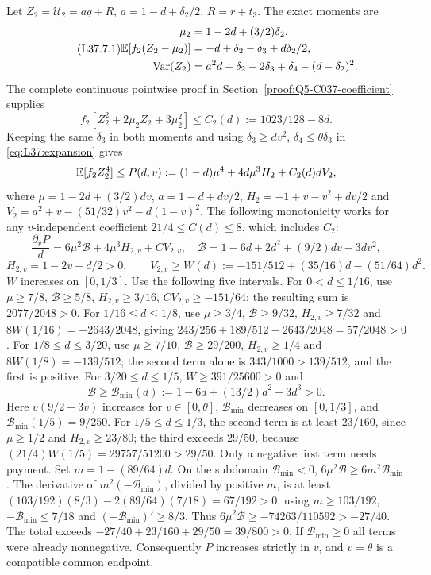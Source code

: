 Let $Z_2=\mathcal U_2=aq+R$, $a=1-d+\delta_2/2$, $R=r+t_3$.
The exact moments are
\begin{equation}\tag{L37.7.1}\label{eq:L37:twoledger}
\begin{aligned}
\mu_2&=1-2d+(3/2)\delta_2,\\
\mathbb E[f_2(Z_2-\mu_2)]&=-d+\delta_2-\delta_3+d\delta_2/2,\\
\operatorname{Var}(Z_2)&=a^2d+\delta_2-2\delta_3+\delta_4-(d-\delta_2)^2.
\end{aligned}
\end{equation}
The complete continuous pointwise proof in
Section~\ref{proof:Q5-C037-coefficient} supplies
\begin{equation}\tag{L37.7.C}\label{eq:L37:C2}
f_2[Z_2^2+2\mu_2Z_2+3\mu_2^2]\le C_2(d):=1023/128-8d.
\end{equation}
Keeping the same $\delta_3$ in both moments and using
$\delta_3\ge dv^2$, $\delta_4\le\theta\delta_3$ in
\eqref{eq:L37:expansion} gives
\[
\mathbb E[f_2Z_2^4]\le P(d,v):=(1-d)\mu^4+4d\mu^3H_2+C_2(d)dV_2,
\]
where
$\mu=1-2d+(3/2)dv$, $a=1-d+dv/2$,
$H_2=-1+v-v^2+dv/2$ and
$V_2=a^2+v-(51/32)v^2-d(1-v)^2$.
The following monotonicity works for any $v$-independent coefficient
$21/4\le C(d)\le8$, which includes $C_2$:
\[
\frac{\partial_vP}{d}=6\mu^2\mathcal B+4\mu^3H_{2,v}+CV_{2,v},
\quad\mathcal B=1-6d+2d^2+(9/2)dv-3dv^2,
\]
\[
H_{2,v}=1-2v+d/2>0,\qquad
V_{2,v}\ge W(d):=-151/512+(35/16)d-(51/64)d^2.
\]
$W$ increases on $[0,1/3]$. Use the following five intervals.
For $0<d\le1/16$, use $\mu\ge7/8$, $\mathcal B\ge5/8$,
$H_{2,v}\ge3/16$, $CV_{2,v}\ge-151/64$; the resulting sum is
$2077/2048>0$.
For $1/16\le d\le1/8$, use $\mu\ge3/4$,
$\mathcal B\ge9/32$, $H_{2,v}\ge7/32$ and
$8W(1/16)=-2643/2048$, giving
$243/256+189/512-2643/2048=57/2048>0$.
For $1/8\le d\le3/20$, use $\mu\ge7/10$,
$\mathcal B\ge29/200$, $H_{2,v}\ge1/4$ and $8W(1/8)=-139/512$;
the second term alone is $343/1000>139/512$, and the first is positive.
For $3/20\le d\le1/5$, $W\ge391/25600>0$ and
\[
\mathcal B\ge\mathcal B_{\min}(d):=1-6d+(13/2)d^2-3d^3>0.
\]
Here $v(9/2-3v)$ increases for $v\in[0,\theta]$,
$\mathcal B_{\min}$ decreases on $[0,1/3]$, and
$\mathcal B_{\min}(1/5)=9/250$.
For $1/5\le d\le1/3$, the second term is at least $23/160$, since
$\mu\ge1/2$ and $H_{2,v}\ge23/80$; the third exceeds $29/50$, because
$(21/4)W(1/5)=29757/51200>29/50$.
Only a negative first term needs payment. Set $m=1-(89/64)d$.
On the subdomain $\mathcal B_{\min}<0$,
$6\mu^2\mathcal B\ge6m^2\mathcal B_{\min}$.
The derivative of $m^2(-\mathcal B_{\min})$, divided by positive $m$,
is at least
$(103/192)(8/3)-2(89/64)(7/18)=67/192>0$,
using $m\ge103/192$, $-\mathcal B_{\min}\le7/18$ and
$(-\mathcal B_{\min})'\ge8/3$.
Thus $6\mu^2\mathcal B\ge-74263/110592>-27/40$.
The total exceeds $-27/40+23/160+29/50=39/800>0$.
If $\mathcal B_{\min}\ge0$ all terms were already nonnegative.
Consequently $P$ increases strictly in $v$, and $v=\theta$ is a
compatible common endpoint.

